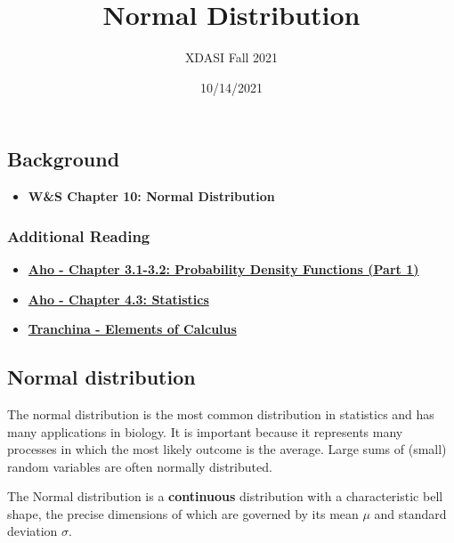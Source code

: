 \documentclass[
]{article}
\title{Normal Distribution}
\author{XDASI Fall 2021}
\date{10/14/2021}
\providecommand{\tightlist}{%
  \setlength{\itemsep}{0pt}\setlength{\parskip}{0pt}}
\begin{document}
\maketitle

{
\setcounter{tocdepth}{3}
\tableofcontents
}
\hypertarget{background}{%
\subsection{Background}\label{background}}

\begin{itemize}
\tightlist
\item
  \textbf{W\&S Chapter 10: Normal Distribution}
\end{itemize}

\hypertarget{additional-reading}{%
\subsubsection{Additional Reading}\label{additional-reading}}

\begin{itemize}
\tightlist
\item
  \href{https://xdas.bio.nyu.edu/references/Aho_Ch3.1-3.2_PDFs_Part1.pdf}{\textbf{Aho
  - Chapter 3.1-3.2: Probability Density Functions (Part 1)}}
\item
  \href{https://xdas.bio.nyu.edu/references/Aho_Ch_4.3_Statistics.pdf}{\textbf{Aho
  - Chapter 4.3: Statistics}}
\item
  \href{https://xdas.bio.nyu.edu/references/CalculusReview_2.0.pdf}{\textbf{Tranchina
  - Elements of Calculus}}
\end{itemize}

\hypertarget{normal-distribution}{%
\subsection{Normal distribution}\label{normal-distribution}}

The normal distribution is the most common distribution in statistics
and has many applications in biology. It is important because it
represents many processes in which the most likely outcome is the
average. Large sums of (small) random variables are often normally
distributed.

The Normal distribution is a \textbf{continuous} distribution with a
characteristic bell shape, the precise dimensions of which are governed
by its mean \(\mu\) and standard deviation \(\sigma\).
\end{document}
